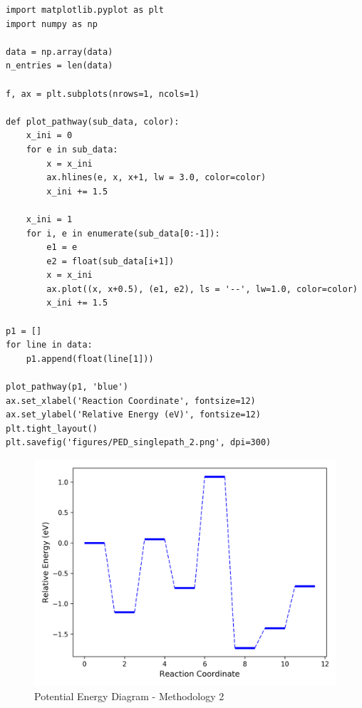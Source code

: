 \documentclass[11pt]{article}
\begin{document}
\begin{verbatim}
import matplotlib.pyplot as plt
import numpy as np

data = np.array(data)
n_entries = len(data)

f, ax = plt.subplots(nrows=1, ncols=1)

def plot_pathway(sub_data, color):
    x_ini = 0
    for e in sub_data:
        x = x_ini
        ax.hlines(e, x, x+1, lw = 3.0, color=color)
        x_ini += 1.5

    x_ini = 1
    for i, e in enumerate(sub_data[0:-1]):
        e1 = e
        e2 = float(sub_data[i+1])
        x = x_ini
        ax.plot((x, x+0.5), (e1, e2), ls = '--', lw=1.0, color=color)
        x_ini += 1.5

p1 = []
for line in data:
    p1.append(float(line[1]))

plot_pathway(p1, 'blue')
ax.set_xlabel('Reaction Coordinate', fontsize=12)
ax.set_ylabel('Relative Energy (eV)', fontsize=12)
plt.tight_layout()
plt.savefig('figures/PED_singlepath_2.png', dpi=300)
\end{verbatim}

\begin{figure}[htbp]
\centering
\includegraphics[width=.9\linewidth]{./figures/PED_singlepath_2.png}
\caption{Potential Energy Diagram - Methodology 2}
\end{figure}
\end{document}
